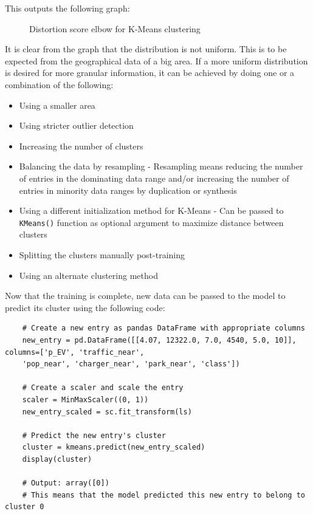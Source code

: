 This outputs the following graph:
\begin{figure}[H]
\begin{center}

\caption{ Distortion score elbow for K-Means clustering }
\end{center}
\end{figure}
It is clear from the graph that the distribution is not uniform. This is to be expected from the geographical data of a big area. If a more uniform distribution is desired for more granular information, it can be achieved by doing one or a combination of the following:
\begin{itemize}
    \item Using a smaller area
    \item Using stricter outlier detection
    \item Increasing the number of clusters
    \item Balancing the data by resampling - Resampling means reducing the number of entries in the dominating data range and/or increasing the number of entries in minority data ranges by duplication or synthesis
    \item Using a different initialization method for K-Means - Can be passed to \verb|KMeans()| function as optional argument to maximize distance between clusters
    \item Splitting the clusters manually post-training
    \item Using an alternate clustering method
\end{itemize}
Now that the training is complete, new data can be passed to the model to predict its cluster using the following code:
\begin{verbatim}
    # Create a new entry as pandas DataFrame with appropriate columns
    new_entry = pd.DataFrame([[4.07, 12322.0, 7.0, 4540, 5.0, 10]], columns=['p_EV', 'traffic_near', 
    'pop_near', 'charger_near', 'park_near', 'class'])
    
    # Create a scaler and scale the entry
    scaler = MinMaxScaler((0, 1))
    new_entry_scaled = sc.fit_transform(ls)
    
    # Predict the new entry's cluster
    cluster = kmeans.predict(new_entry_scaled)
    display(cluster)
    
    # Output: array([0])
    # This means that the model predicted this new entry to belong to cluster 0
\end{verbatim}
